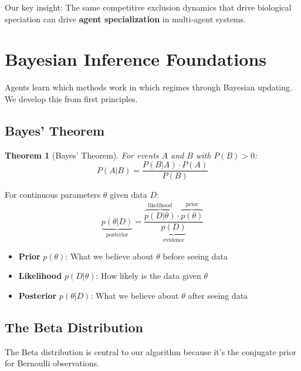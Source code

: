 \documentclass[11pt,a4paper]{article}
\theoremstyle{definition}
\theoremstyle{plain}
\newtheorem{theorem}{Theorem}[section]
\begin{document}
\begin{keypoint}
Our key insight: The same competitive exclusion dynamics that drive biological speciation can drive \textbf{agent specialization} in multi-agent systems.
\end{keypoint}

\newpage
\section{Bayesian Inference Foundations}

Agents learn which methods work in which regimes through Bayesian updating. We develop this from first principles.

\subsection{Bayes' Theorem}

\begin{theorem}[Bayes' Theorem]
For events $A$ and $B$ with $P(B) > 0$:
\begin{equation}
P(A|B) = \frac{P(B|A) \cdot P(A)}{P(B)}
\end{equation}
\end{theorem}

For continuous parameters $\theta$ given data $D$:
\begin{equation}
\underbrace{p(\theta|D)}_{\text{posterior}} = \frac{\overbrace{p(D|\theta)}^{\text{likelihood}} \cdot \overbrace{p(\theta)}^{\text{prior}}}{\underbrace{p(D)}_{\text{evidence}}}
\end{equation}

\begin{intuition}
\begin{itemize}
    \item \textbf{Prior} $p(\theta)$: What we believe about $\theta$ before seeing data
    \item \textbf{Likelihood} $p(D|\theta)$: How likely is the data given $\theta$
    \item \textbf{Posterior} $p(\theta|D)$: What we believe about $\theta$ after seeing data
\end{itemize}
\end{intuition}

\subsection{The Beta Distribution}

The Beta distribution is central to our algorithm because it's the conjugate prior for Bernoulli observations.
\end{document}
